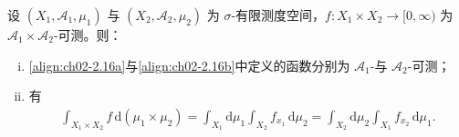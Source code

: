 \documentclass[../../main.tex]{subfiles}%
\begin{document}
\begin{theorem}[Tonelli]\label{theorem:ch02-Tonelli}
设 $(X_1,\mathscr A_1,\mu_1)$ 与 $(X_2,\mathscr A_2,\mu_2)$ 为 $\sigma$-有限测度空间，$f:X_1\times X_2\to[0,\infty)$ 为 $\mathscr A_1\times\mathscr A_2$-可测。则：
\begin{enumerate}[(i)]
\item \eqref{align:ch02-2.16a}与\eqref{align:ch02-2.16b}中定义的函数分别为 $\mathscr A_1$-与 $\mathscr A_2$-可测；
\item 有
\begin{align}
\int_{X_1\times X_2}f\,\mathrm{d}(\mu_1\times\mu_2)
=\int_{X_1}\mathrm{d}\mu_1\int_{X_2}f_{x_1}\,\mathrm{d}\mu_2
=\int_{X_2}\mathrm{d}\mu_2\int_{X_1}f_{x_2}\,\mathrm{d}\mu_1. \label{align:ch02-2.17}
\end{align}
\end{enumerate}
\end{theorem}
\end{document}
